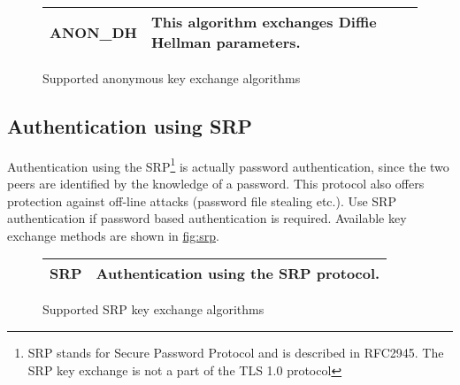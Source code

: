 \begin{figure}[hbtp]
\begin{tabular}{|l|p{9cm}|}

\hline
ANON\_DH & This algorithm exchanges Diffie Hellman parameters. 
\\
\hline
\end{tabular}

\caption{Supported anonymous key exchange algorithms}
\label{fig:anon}

\end{figure}

\subsection{Authentication using SRP}
Authentication using the SRP\footnote{SRP stands for Secure Password Protocol and 
is described in RFC2945. The SRP key exchange is not a part of the TLS 1.0 protocol}
is actually password authentication, since the two peers are identified by the knowledge 
of a password. This protocol also offers protection against off-line attacks (password file stealing
etc.). Use SRP authentication if password based authentication is required.
Available key exchange methods are shown in \hyperref{figure}{figure }{}{fig:srp}.

\begin{figure}[hbtp]
\begin{tabular}{|l|p{9cm}|}

\hline
SRP & Authentication using the SRP protocol. 
\\
\hline
\end{tabular}

\caption{Supported SRP key exchange algorithms}
\label{fig:srp}

\end{figure}

